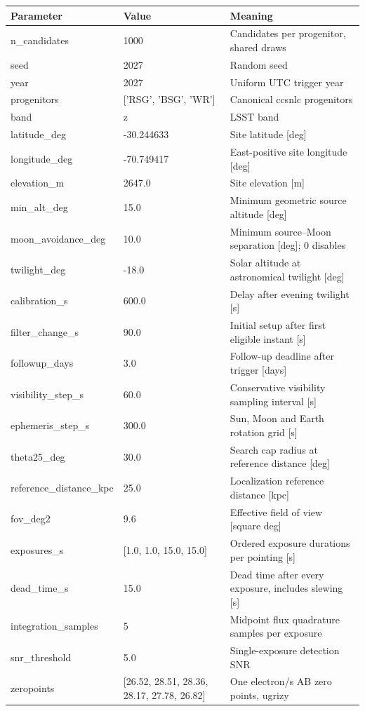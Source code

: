 \begin{longtable}{p{.29\linewidth}p{.25\linewidth}p{.37\linewidth}}
\toprule Parameter & Value & Meaning \\ \midrule\endhead
n\_candidates & 1000 & Candidates per progenitor, shared draws \\
seed & 2027 & Random seed \\
year & 2027 & Uniform UTC trigger year \\
progenitors & ['RSG', 'BSG', 'WR'] & Canonical ccsnlc progenitors \\
band & z & LSST band \\
latitude\_deg & -30.244633 & Site latitude [deg] \\
longitude\_deg & -70.749417 & East-positive site longitude [deg] \\
elevation\_m & 2647.0 & Site elevation [m] \\
min\_alt\_deg & 15.0 & Minimum geometric source altitude [deg] \\
moon\_avoidance\_deg & 10.0 & Minimum source--Moon separation [deg]; 0 disables \\
twilight\_deg & -18.0 & Solar altitude at astronomical twilight [deg] \\
calibration\_s & 600.0 & Delay after evening twilight [s] \\
filter\_change\_s & 90.0 & Initial setup after first eligible instant [s] \\
followup\_days & 3.0 & Follow-up deadline after trigger [days] \\
visibility\_step\_s & 60.0 & Conservative visibility sampling interval [s] \\
ephemeris\_step\_s & 300.0 & Sun, Moon and Earth rotation grid [s] \\
theta25\_deg & 30.0 & Search cap radius at reference distance [deg] \\
reference\_distance\_kpc & 25.0 & Localization reference distance [kpc] \\
fov\_deg2 & 9.6 & Effective field of view [square deg] \\
exposures\_s & [1.0, 1.0, 15.0, 15.0] & Ordered exposure durations per pointing [s] \\
dead\_time\_s & 15.0 & Dead time after every exposure, includes slewing [s] \\
integration\_samples & 5 & Midpoint flux quadrature samples per exposure \\
snr\_threshold & 5.0 & Single-exposure detection SNR \\
zeropoints & [26.52, 28.51, 28.36, 28.17, 27.78, 26.82] & One electron/s AB zero points, ugrizy \\

\end{longtable}
